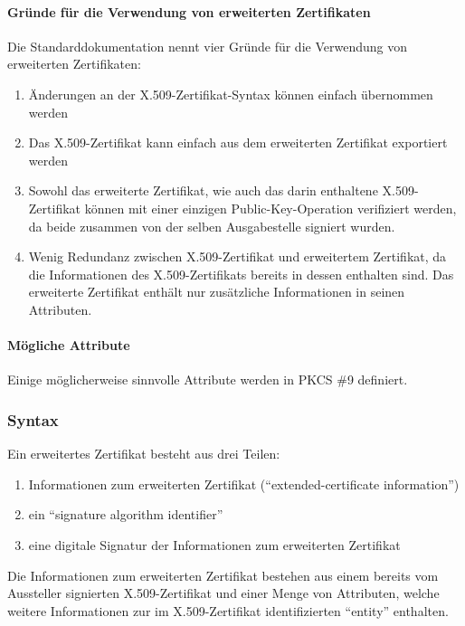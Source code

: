 \documentclass[10pt,a4paper]{article}
\begin{document}
\paragraph{Gründe für die Verwendung von erweiterten Zertifikaten}
Die Standarddokumentation nennt vier Gründe für die Verwendung von erweiterten
Zertifikaten:
\begin{enumerate}
    \item Änderungen an der X.509-Zertifikat-Syntax können einfach übernommen werden
    \item Das X.509-Zertifikat kann einfach aus dem erweiterten Zertifikat exportiert
        werden
    \item Sowohl das erweiterte Zertifikat, wie auch das darin enthaltene X.509-Zertifikat
        können mit einer einzigen Public-Key-Operation verifiziert werden, da beide
        zusammen von der selben Ausgabestelle signiert wurden.
    \item Wenig Redundanz zwischen X.509-Zertifikat und erweitertem Zertifikat, da die
        Informationen des X.509-Zertifikats bereits in dessen enthalten sind. Das
        erweiterte Zertifikat enthält nur zusätzliche Informationen in seinen Attributen.
\end{enumerate}

\paragraph{Mögliche Attribute}
Einige möglicherweise sinnvolle Attribute werden in PKCS \#9 definiert.

\subsubsection{Syntax}
Ein erweitertes Zertifikat besteht aus drei Teilen:
\begin{enumerate}
    \item Informationen zum erweiterten Zertifikat ("`extended-certificate information"')
    \item ein "`signature algorithm identifier"'
    \item eine digitale Signatur der Informationen zum erweiterten Zertifikat
\end{enumerate}

Die Informationen zum erweiterten Zertifikat bestehen aus einem bereits vom Aussteller
signierten X.509-Zertifikat und einer Menge von Attributen, welche weitere Informationen
zur im X.509-Zertifikat identifizierten "`entity"' enthalten.
\end{document}
